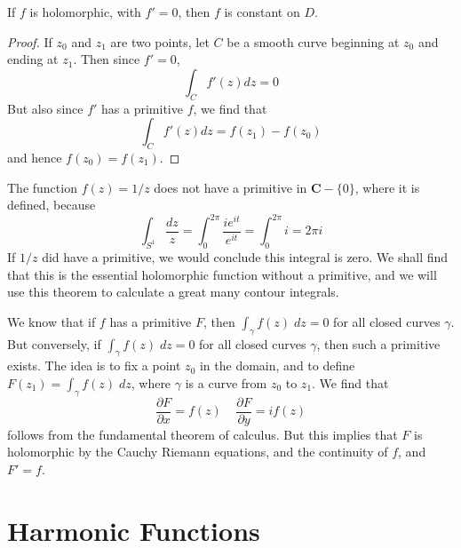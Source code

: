 \begin{corollary}
    If $f$ is holomorphic, with $f' = 0$, then $f$ is constant on $D$.
\end{corollary}
\begin{proof}
    If $z_0$ and $z_1$ are two points, let $C$ be a smooth curve beginning at $z_0$ and ending at $z_1$. Then since $f' = 0$,
    \[ \int_C f'(z) dz = 0  \]
    But also since $f'$ has a primitive $f$, we find that
    \[ \int_C f'(z) dz = f(z_1) - f(z_0) \]
    and hence $f(z_0) = f(z_1)$.
\end{proof}

\begin{example}
    The function $f(z) = 1/z$ does not have a primitive in $\mathbf{C} - \{ 0 \}$, where it is defined, because
    \[ \int_{S^1} \frac{dz}{z} = \int_0^{2\pi} \frac{ie^{it}}{e^{it}} = \int_0^{2\pi} i = 2 \pi i \]
    If $1/z$ did have a primitive, we would conclude this integral is zero. We shall find that this is the essential holomorphic function without a primitive, and we will use this theorem to calculate a great many contour integrals.
\end{example}

We know that if $f$ has a primitive $F$, then $\int_\gamma f(z)\; dz = 0$ for all closed curves $\gamma$. But conversely, if $\int_\gamma f(z)\; dz = 0$ for all closed curves $\gamma$, then such a primitive exists. The idea is to fix a point $z_0$ in the domain, and to define $F(z_1) = \int_\gamma f(z)\; dz$, where $\gamma$ is a curve from $z_0$ to $z_1$. We find that
%
\[ \frac{\partial F}{\partial x} = f(z)\ \ \ \ \ \frac{\partial F}{\partial y} = i f(z) \]
%
follows from the fundamental theorem of calculus. But this implies that $F$ is holomorphic by the Cauchy Riemann equations, and the continuity of $f$, and $F' = f$.







\section{Harmonic Functions}

